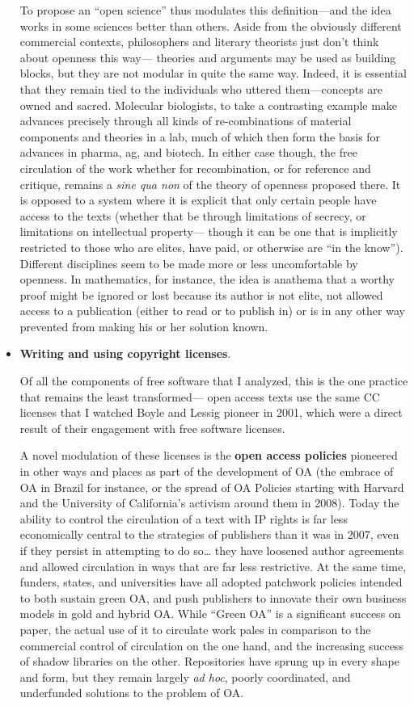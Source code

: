 \documentclass[11pt]{article}
\begin{document}
\begin{itemize}
To propose an ``open science'' thus modulates this definition---and the idea works in some sciences better than others.  Aside from the obviously different commercial contexts, philosophers and literary theorists just don't think about openness this way--- theories and arguments may be used as building blocks, but they are not modular in quite the same way.  Indeed, it is essential that they remain tied to the individuals who uttered them---concepts are owned and sacred.  Molecular biologists, to take a contrasting example make advances precisely through all kinds of re-combinations of material components and theories in a lab, much of which then form the basis for advances in pharma, ag, and biotech.    In either case though, the free circulation of the work whether for recombination, or for reference and critique, remains a \emph{sine qua non} of the theory of openness proposed there.   It is opposed to a system where it is explicit that only certain people have access to the texts (whether that be through limitations of secrecy, or limitations on intellectual property--- though it can be one that is implicitly restricted to those who are elites, have paid, or otherwise are ``in the know'').  Different disciplines seem to be made more or less uncomfortable by openness.  In mathematics, for instance, the idea is anathema that a worthy proof might be ignored or lost because its author is not elite, not allowed access to a publication (either to read or to publish in) or is in any other way prevented from making his or her solution known. 

\item \textbf{Writing and using copyright licenses}.
\label{sec:orgdd39195}

Of all the components of free software that I analyzed, this is the one practice that remains the least transformed--- open access texts use the same CC licenses that I watched  Boyle and Lessig pioneer in 2001, which were a direct result of their engagement with free software licenses.

A novel modulation of these licenses is the \textbf{open access policies} pioneered in other ways and places as part of the development of OA (the embrace of OA in Brazil for instance, or the spread of OA Policies starting with Harvard and the University of California's activism around them in 2008).  Today the ability to control the circulation of a text with IP rights is far less economically central to the strategies of publishers than it was in 2007, even if they persist in attempting to do so\ldots{} they have loosened author agreements and allowed circulation in ways that are far less restrictive.  At the same time, funders, states, and universities have all adopted patchwork policies intended to both sustain green OA, and push publishers to innovate their own business models in gold and hybrid OA.  While ``Green OA'' is a significant success on paper, the actual use of it to circulate work pales in comparison to the commercial control of circulation on the one hand, and the increasing success of shadow libraries on the other. Repositories have sprung up in every shape and form, but they remain largely \emph{ad hoc}, poorly coordinated, and underfunded solutions to the problem of OA.


\end{itemize}
\end{document}
